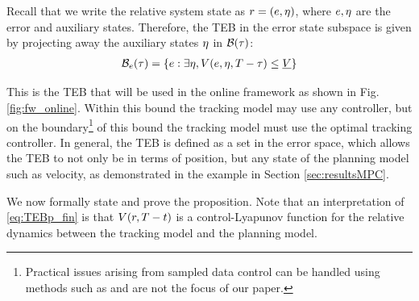 Recall that we write the relative system state as $r = (e, \eta)$, where $e,\eta$ are the error and auxiliary states.
Therefore, the TEB in the error state subspace is given by projecting away the auxiliary states $\eta$ in $\mathcal B(\tau)$:
  \begin{align} \label{eq:TEBp_fin}
  \TEB_\estate(\tau) = \{\estate: \exists \astate, \valfunc(\estate, \astate, \thor-\tau) \le \underline\valfunc\}
  \end{align}
  
This is the TEB that will be used in the online framework as shown in Fig. \ref{fig:fw_online}. 
Within this bound the tracking model may use any controller, but on the boundary\footnote{Practical issues arising from sampled data control can be handled using methods such as \cite{Mitchell2012, Mitchell13, Dabadie2014} and are not the focus of our paper.} of this bound the tracking model must use the optimal tracking controller.
In general, the TEB is defined as a set in the error space, which allows the TEB to not only be in terms of position, but any state of the planning model such as velocity, as demonstrated in the example in Section \ref{sec:resultsMPC}.

We now formally state and prove the proposition. 
Note that an interpretation of \eqref{eq:TEBp_fin} is that $V(r, T - t)$ is a control-Lyapunov function for the relative dynamics between the tracking model and the planning model.

